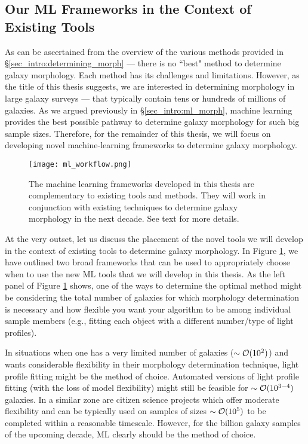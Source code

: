 \subsection{Our ML Frameworks in the Context of Existing Tools} \label{sec_intro:ml_complementary}
As can be ascertained from the overview of the various methods provided in \S \ref{sec_intro:determining_morph} --- there is no ``best" method to determine galaxy morphology. Each method has its challenges and limitations. However, as the title of this thesis suggests, we are interested in determining morphology in large galaxy surveys --- that typically contain tens or hundreds of millions of galaxies. As we argued previously in \S \ref{sec_intro:ml_morph}, machine learning provides the best possible pathway to determine galaxy morphology for such big sample sizes. Therefore, for the remainder of this thesis, we will focus on developing novel machine-learning frameworks to determine galaxy morphology. 

\begin{figure}[htbp]
    \centering
    \texttt{[image: ml\_workflow.png]}
    \caption{The machine learning frameworks developed in this thesis are complementary to existing tools and methods. They will work in conjunction with existing techniques to determine galaxy morphology in the next decade. See text for more details.}
    \label{fig_intro:ml_workflow}
\end{figure}

At the very outset, let us discuss the placement of the novel tools we will develop in the context of existing tools to determine galaxy morphology. In Figure \ref{fig_intro:ml_workflow}, we have outlined two broad frameworks that can be used to appropriately choose when to use the new ML tools that we will develop in this thesis. As the left panel of Figure \ref{fig_intro:ml_workflow} shows, one of the ways to determine the optimal method might be considering the total number of galaxies for which morphology determination is necessary and how flexible you want your algorithm to be among individual sample members (e.g., fitting each object with a different number/type of light profiles). 

In situations when one has a very limited number of galaxies ($\sim \mathcal{O}(10^{2})$) and wants considerable flexibility in their morphology determination technique, light profile fitting might be the method of choice. Automated versions of light profile fitting (with the loss of model flexibility) might still be feasible for $\sim \mathcal{O}(10^{3-4})$ galaxies. In a similar zone are citizen science projects which offer moderate flexibility and can be typically used on samples of sizes $\sim \mathcal{O}(10^{5})$ to be completed within a reasonable timescale. However, for the billion galaxy samples of the upcoming decade, ML clearly should be the method of choice. 

